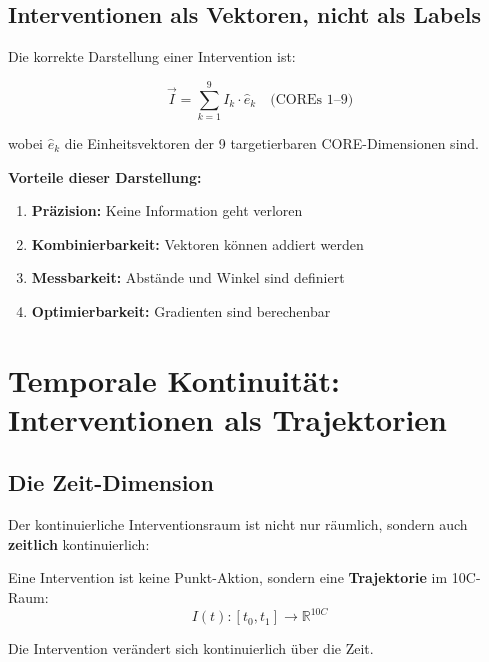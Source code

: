 \subsection{Interventionen als Vektoren, nicht als Labels}
\label{sec:17-vectors}

Die korrekte Darstellung einer Intervention ist:

\begin{equation}
\vec{I} = \sum_{k=1}^{9} I_k \cdot \hat{e}_k \quad \text{(COREs 1--9)}
\label{eq:17-vector-sum}
\end{equation}

wobei $\hat{e}_k$ die Einheitsvektoren der 9 targetierbaren CORE-Dimensionen sind.

\textbf{Vorteile dieser Darstellung:}
\begin{enumerate}[nosep]
\item \textbf{Pr\"{a}zision:} Keine Information geht verloren
\item \textbf{Kombinierbarkeit:} Vektoren k\"{o}nnen addiert werden
\item \textbf{Messbarkeit:} Abst\"{a}nde und Winkel sind definiert
\item \textbf{Optimierbarkeit:} Gradienten sind berechenbar
\end{enumerate}



\section{Temporale Kontinuit\"{a}t: Interventionen als Trajektorien}
\label{sec:17-temporal}

\subsection{Die Zeit-Dimension}
\label{sec:17-time}

Der kontinuierliche Interventionsraum ist nicht nur r\"{a}umlich, sondern auch \textbf{zeitlich} kontinuierlich:

\begin{tcolorbox}[colback=blue!5!white, colframe=blue!75!black,
    title=\textbf{Definition: Interventions-Trajektorie}]

Eine Intervention ist keine Punkt-Aktion, sondern eine \textbf{Trajektorie} im 10C-Raum:
\begin{equation}
\boxed{I(t): [t_0, t_1] \rightarrow \mathbb{R}^{10C}}
\label{eq:17-trajectory}
\end{equation}

Die Intervention ver\"{a}ndert sich kontinuierlich \"{u}ber die Zeit.

\end{tcolorbox}

